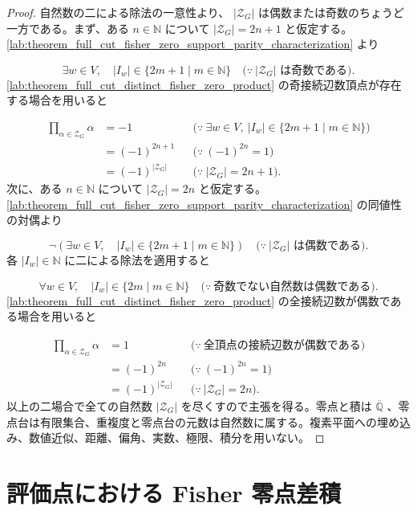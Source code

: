\documentclass[11pt,a4paper]{article}
\theoremstyle{remark}
\begin{document}
\begin{proof}
自然数の二による除法の一意性より、
$|\mathcal Z_G|$
 は偶数または奇数のちょうど一方である。まず、ある 
$n\in\mathbb N$
 について 
$|\mathcal Z_G|=2n+1$
 と仮定する。
\cref{lab:theorem_full_cut_fisher_zero_support_parity_characterization}
 より

\[\exists w\in V,\quad
|I_w|\in\{2m+1\mid m\in\mathbb N\}
\quad\bigl(\because\ |\mathcal Z_G|\text{ は奇数である}\bigr).\]
\cref{lab:theorem_full_cut_distinct_fisher_zero_product}
 の奇接続辺数頂点が存在する場合を用いると

\[\begin{aligned}
\prod_{\alpha\in\mathcal Z_G}\alpha
&=-1
&&\bigl(\because\ \exists w\in V,\ |I_w|\in\{2m+1\mid m\in\mathbb N\}\bigr)\\
&=(-1)^{2n+1}
&&\bigl(\because\ (-1)^{2n}=1\bigr)\\
&=(-1)^{|\mathcal Z_G|}
&&\bigl(\because\ |\mathcal Z_G|=2n+1\bigr).
\end{aligned}\]
次に、ある 
$n\in\mathbb N$
 について 
$|\mathcal Z_G|=2n$
 と仮定する。
\cref{lab:theorem_full_cut_fisher_zero_support_parity_characterization}
 の同値性の対偶より

\[\neg\left(
\exists w\in V,\quad |I_w|\in\{2m+1\mid m\in\mathbb N\}
\right)
\quad\bigl(\because\ |\mathcal Z_G|\text{ は偶数である}\bigr).\]
各 
$|I_w|\in\mathbb N$
 に二による除法を適用すると

\[\forall w\in V,\quad
|I_w|\in\{2m\mid m\in\mathbb N\}
\quad\bigl(\because\ \text{奇数でない自然数は偶数である}\bigr).\]
\cref{lab:theorem_full_cut_distinct_fisher_zero_product}
 の全接続辺数が偶数である場合を用いると

\[\begin{aligned}
\prod_{\alpha\in\mathcal Z_G}\alpha
&=1
&&\bigl(\because\ \text{全頂点の接続辺数が偶数である}\bigr)\\
&=(-1)^{2n}
&&\bigl(\because\ (-1)^{2n}=1\bigr)\\
&=(-1)^{|\mathcal Z_G|}
&&\bigl(\because\ |\mathcal Z_G|=2n\bigr).
\end{aligned}\]
以上の二場合で全ての自然数 
$|\mathcal Z_G|$
 を尽くすので主張を得る。零点と積は 
$\overline{\mathbb Q}$
、零点台は有限集合、重複度と零点台の元数は自然数に属する。複素平面への埋め込み、数値近似、距離、偏角、実数、極限、積分を用いない。

\end{proof}

\section{評価点における Fisher 零点差積}
\end{document}
